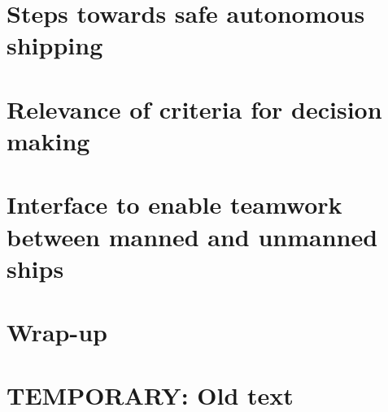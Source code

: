 \documentclass[a4paper,11pt,oneside]{book}
\begin{document}
\frontmatter


\makeCover %

\listoftodos[Notes]
\clearpage





\clearpage
\setcounter{tocdepth}{1}
\tableofcontents
\clearpage

\mainmatter



\part{Steps towards safe autonomous shipping}






\part{Relevance of criteria for decision making}
\label{part:MT}









\part{Interface to enable teamwork between manned and unmanned ships}
\label{part:CS}





\part{Wrap-up}



\backmatter

\part{TEMPORARY: Old text}








\end{document}
